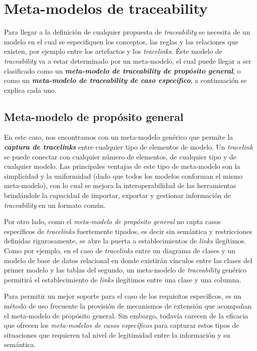 \documentclass[a4paper,12pt,oneside,spanish]{book}
\begin{document}
\section{Meta-modelos de traceability}

Para llegar a la definición de cualquier propuesta de \textit{traceability} se necesita de un modelo en el cual se especifiquen los conceptos, las reglas y las relaciones que existen, por ejemplo entre los artefactos y los \textit{tracelinks}. Éste modelo de \textit{traceability} va a estar determinado por un meta-modelo, el cual puede llegar a ser clasificado como un \textit{\textbf{meta-modelo de traceability de propósito general}}, o como un \textit{\textbf{meta-modelo de traceability de caso específico}}, a continuación se explica cada uno.

\subsection{Meta-modelo de propósito general}

En este caso, nos encontramos con un meta-modelo genérico que permite la \textit{\textbf{captura de tracelinks}} entre cualquier tipo de elementos de modelo. Un \textit{tracelink} se puede conectar con cualquier número de elementos, de cualquier tipo y de cualquier modelo. Las principales ventajas de este tipo de meta-modelo son la simplicidad y la uniformidad (dado que todos los modelos conforman el mismo meta-modelo), con lo cual se mejora la interoperabilidad de las herramientas brindándole la capacidad de importar, exportar y gestionar información de \textit{traceability} en un formato común.

Por otro lado, como el \textit{meta-modelo de propósito general} no capta casos específicos de \textit{tracelinks} fuertemente tipados, es decir sin semántica y restricciones definidas rigurosamente, se abre la puerta a establecimientos de \textit{links} ilegítimos. Como por ejemplo, en el caso de \textit{tracelinks} entre un diagrama de clases y un modelo de base de datos relacional en donde existirán vínculos entre las clases del primer modelo y las tablas del segundo, un meta-modelo de \textit{traceability} genérico permitirá el establecimiento de \textit{links} ilegítimos entre una clase y una columna.

Para permitir un mejor soporte para el caso de los requisitos específicos, es un método de uso frecuente la provisión de mecanismos de extensión que acompañan el meta-modelo de propósito general. Sin embargo, todavía carecen de la eficacia que ofrecen los \textit{meta-modelos de casos específicos} para capturar estos tipos de situaciones que requieren tal nivel de legitimidad entre la información y su semántica.
\end{document}
